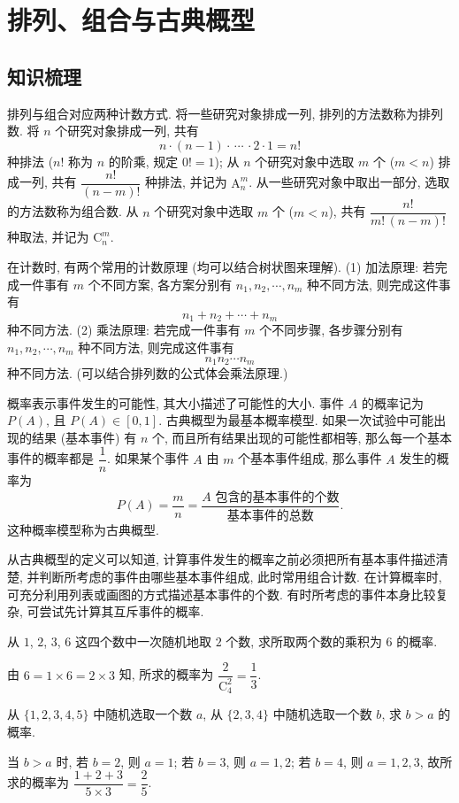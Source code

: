 
\section{排列、组合与古典概型}

\subsection{知识梳理}

排列与组合对应两种计数方式. 将一些研究对象排成一列, 排列的方法数称为排列数. 将 $n$ 个研究对象排成一列, 共有
\[n\cdot (n-1)\cdot\, \cdots\, \cdot 2\cdot 1 = n!\]
种排法 ($n!$ 称为 $n$ 的阶乘, 规定 $0!=1$); 从 $n$ 个研究对象中选取 $m$ 个 ($m<n$) 排成一列, 共有 $\dfrac{n!}{(n-m)!}$ 种排法, 并记为 $\mathrm{A}_n^m$. 从一些研究对象中取出一部分, 选取的方法数称为组合数. 从 $n$ 个研究对象中选取 $m$ 个 ($m<n$), 共有 $\dfrac{n!}{m!\,(n-m)!}$ 种取法, 并记为 $\mathrm{C}_n^m$.

在计数时, 有两个常用的计数原理 (均可以结合树状图来理解). (1) 加法原理: 若完成一件事有 $m$ 个不同方案, 各方案分别有 $n_1, n_2,\cdots, n_m$ 种不同方法, 则完成这件事有
\[n_1+ n_2+\cdots +n_m\]
种不同方法. (2) 乘法原理: 若完成一件事有 $m$ 个不同步骤, 各步骤分别有 $n_1, n_2,\cdots, n_m$ 种不同方法, 则完成这件事有
\[n_1 n_2\cdots n_m\]
种不同方法. (可以结合排列数的公式体会乘法原理.)

概率表示事件发生的可能性, 其大小描述了可能性的大小. 事件 $A$ 的概率记为 $P(A)$, 且 $P(A)\in [0,1]$. 古典概型为最基本概率模型. 如果一次试验中可能出现的结果 (基本事件) 有 $n$ 个, 而且所有结果出现的可能性都相等, 那么每一个基本事件的概率都是 $\dfrac1n$. 如果某个事件 $A$ 由 $m$ 个基本事件组成, 那么事件 $A$ 发生的概率为
\[P(A)=\frac{m}n
    = \frac{\text{$A$ 包含的基本事件的个数}}{\text{基本事件的总数}}.\]
这种概率模型称为古典概型.

从古典概型的定义可以知道, 计算事件发生的概率之前必须把所有基本事件描述清楚, 并判断所考虑的事件由哪些基本事件组成, 此时常用组合计数. 在计算概率时, 可充分利用列表或画图的方式描述基本事件的个数. 有时所考虑的事件本身比较复杂, 可尝试先计算其互斥事件的概率.

\lianxi
\begin{exercise}
    从 $1$, $2$, $3$, $6$ 这四个数中一次随机地取 $2$ 个数, 求所取两个数的乘积为 $6$ 的概率.
\end{exercise}
\beginsolution
    由 $6= 1\times 6= 2\times 3$ 知, 所求的概率为 $\dfrac2{\mathrm{C}_4^2}= \dfrac13$.
\endsolution

\begin{exercise}
    从 $\{1, 2, 3, 4, 5\}$ 中随机选取一个数 $a$, 从 $\{2, 3, 4\}$ 中随机选取一个数 $b$, 求 $b>a$ 的概率.
\end{exercise}
\beginsolution
    当 $b>a$ 时, 若 $b=2$, 则 $a=1$; 若 $b=3$, 则 $a=1,2$; 若 $b=4$, 则 $a=1,2,3$, 故所求的概率为 $\dfrac{1+2+3}{5\times 3}= \dfrac2{5}$.
\endsolution

